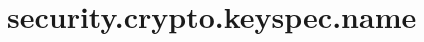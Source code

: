 \section{security.crypto.keyspec.name}
\label{configuration:SecurityCryptoKeyspecName}
\AvailableInJavaOnly{\TODO}